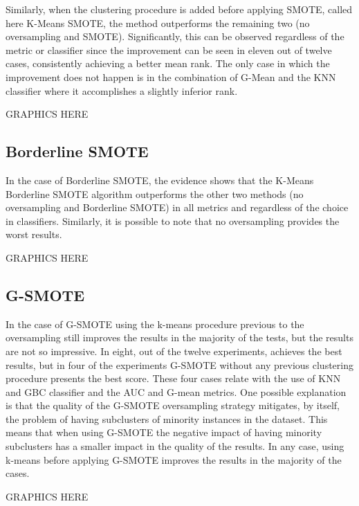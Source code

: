 \documentclass[parskip=full]{scrartcl}
\begin{document}
Similarly, when the clustering procedure is added before applying SMOTE, called
here K-Means SMOTE, the method outperforms the remaining two (no oversampling
and SMOTE). Significantly, this can be observed regardless of the metric or
classifier since the improvement can be seen in eleven out of twelve cases,
consistently achieving a better mean rank. The only case in which the
improvement does not happen is in the combination of G-Mean and the KNN
classifier where it accomplishes a slightly inferior rank.

GRAPHICS HERE

\subsection{Borderline SMOTE}

In the case of Borderline SMOTE, the evidence shows that the K-Means Borderline
SMOTE algorithm outperforms the other two methods (no oversampling and
Borderline SMOTE) in all metrics and regardless of the choice in classifiers.
Similarly, it is possible to note that no oversampling provides the worst
results.

GRAPHICS HERE

\subsection{G-SMOTE}

In the case of G-SMOTE using the k-means procedure previous to the oversampling
still improves the results in the majority of the tests, but the results are not
so impressive. In eight, out of the twelve experiments, achieves the best
results, but in four of the experiments G-SMOTE without any previous clustering
procedure presents the best score. These four cases relate with the use of KNN
and GBC classifier and the AUC and G-mean metrics. One possible explanation is
that the quality of the G-SMOTE oversampling strategy mitigates, by itself, the
problem of having subclusters of minority instances in the dataset. This means
that when using G-SMOTE the negative impact of having minority subclusters has a
smaller impact in the quality of the results. In any case, using k-means before
applying G-SMOTE improves the results in the majority of the cases.

GRAPHICS HERE
\end{document}
